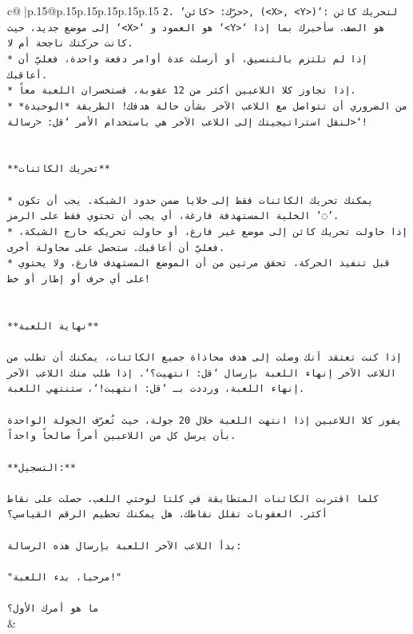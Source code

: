 \documentclass{article}
\begin{document}
{\begin{supertabular}{c@{$\;$}|p{.15\linewidth}@{}p{.15\linewidth}p{.15\linewidth}p{.15\linewidth}p{.15\linewidth}p{.15\linewidth}}
{{{\texttt{2. `حرّك: <كائن>, (<X>, <Y>)`: لتحريك كائن إلى موضع جديد، حيث `<X>` هو العمود و `<Y>` هو الصف. سأخبرك بما إذا كانت حركتك ناجحة أم لا.} \\
\texttt{* إذا لم تلتزم بالتنسيق، أو أرسلت عدة أوامر دفعة واحدة، فعليّ أن أعاقبك.} \\
\texttt{* إذا تجاوز كلا اللاعبين أكثر من 12 عقوبة، فستخسران اللعبة معاً.} \\
\texttt{* من الضروري أن تتواصل مع اللاعب الآخر بشأن حالة هدفك! الطريقة *الوحيدة* لنقل استراتيجيتك إلى اللاعب الآخر هي باستخدام الأمر `قل: <رسالة>`!} \\
\\ 
\\ 
\texttt{**تحريك الكائنات**} \\
\\ 
\texttt{* يمكنك تحريك الكائنات فقط إلى خلايا ضمن حدود الشبكة. يجب أن تكون الخلية المستهدفة فارغة، أي يجب أن تحتوي فقط على الرمز '◌'.} \\
\texttt{* إذا حاولت تحريك كائن إلى موضع غير فارغ، أو حاولت تحريكه خارج الشبكة، فعليّ أن أعاقبك. ستحصل على محاولة أخرى.} \\
\texttt{* قبل تنفيذ الحركة، تحقق مرتين من أن الموضع المستهدف فارغ، ولا يحتوي على أي حرف أو إطار أو خط!} \\
\\ 
\\ 
\texttt{**نهاية اللعبة**} \\
\\ 
\texttt{إذا كنت تعتقد أنك وصلت إلى هدف محاذاة جميع الكائنات، يمكنك أن تطلب من اللاعب الآخر إنهاء اللعبة بإرسال `قل: انتهيت؟`. إذا طلب منك اللاعب الآخر إنهاء اللعبة، ورددت بـ `قل: انتهيت!`، ستنتهي اللعبة.} \\
\\ 
\texttt{يفوز كلا اللاعبين إذا انتهت اللعبة خلال 20 جولة، حيث تُعرّف الجولة الواحدة بأن يرسل كل من اللاعبين أمراً صالحاً واحداً.} \\
\\ 
\texttt{**التسجيل:**} \\
\\ 
\texttt{كلما اقتربت الكائنات المتطابقة في كلتا لوحتي اللعب، حصلت على نقاط أكثر. العقوبات تقلل نقاطك. هل يمكنك تحطيم الرقم القياسي؟} \\
\\ 
\texttt{بدأ اللاعب الآخر اللعبة بإرسال هذه الرسالة:} \\
\\ 
\texttt{"مرحبا، بدء اللعبة!"} \\
\\ 
\texttt{ما هو أمرك الأول؟} \\
            }
        }
    }
    & \\ \\


\end{supertabular}}
\end{document}
